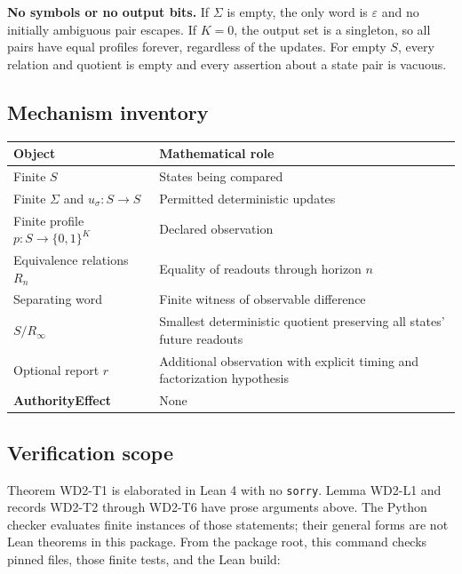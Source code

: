 \documentclass[
  11pt,
]{article}
\begin{document}
\textbf{No symbols or no output bits.} If \(\Sigma\) is empty, the only
word is \(\varepsilon\) and no initially ambiguous pair escapes. If
\(K=0\), the output set is a singleton, so all pairs have equal profiles
forever, regardless of the updates. For empty \(S\), every relation and
quotient is empty and every assertion about a state pair is vacuous.

\subsection{Mechanism inventory}\label{mechanism-inventory}

\begin{longtable}[]{@{}
  >{\raggedright\arraybackslash}p{}
  >{\raggedright\arraybackslash}p{}@{}}
\toprule\noalign{}
\begin{minipage}[b]{\linewidth}\raggedright
Object
\end{minipage} & \begin{minipage}[b]{\linewidth}\raggedright
Mathematical role
\end{minipage} \\
\midrule\noalign{}
\endhead
\bottomrule\noalign{}
\endlastfoot
Finite \(S\) & States being compared \\
Finite \(\Sigma\) and \(u_\sigma:S\to S\) & Permitted deterministic
updates \\
Finite profile \(p:S\to\{0,1\}^K\) & Declared observation \\
Equivalence relations \(R_n\) & Equality of readouts through horizon
\(n\) \\
Separating word & Finite witness of observable difference \\
\(S/R_\infty\) & Smallest deterministic quotient preserving all states'
future readouts \\
Optional report \(r\) & Additional observation with explicit timing and
factorization hypothesis \\
\textbf{AuthorityEffect} & None \\
\end{longtable}

\subsection{Verification scope}\label{verification-scope}

Theorem WD2-T1 is elaborated in Lean 4 with no \texttt{sorry}. Lemma
WD2-L1 and records WD2-T2 through WD2-T6 have prose arguments above.
The Python checker evaluates finite instances of those statements; their
general forms are not Lean theorems in this package. From the package
root, this command checks pinned files, those finite tests, and the Lean
build:
\end{document}

